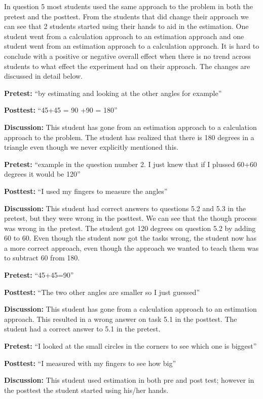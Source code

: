 \bigskip\noindent
In question 5 most students used the same approach to the problem in both the pretest and the posttest. From the students that did change their approach we can see that 2 students started using their hands to aid in the estimation. One student went from a calculation approach to an estimation approach and one student went from an estimation approach to a calculation approach. It is hard to conclude with a positive or negative overall effect when there is no trend across students to what effect the experiment had on their approach. The changes are discussed in detail below.

\bigskip\noindent
\textbf{Pretest:} ``by estimating and looking at the other angles for example''
\par\noindent \textbf{Posttest:} ``45+45 = 90  +90 = 180''
\par\noindent \textbf{Discussion:} This student has gone from an estimation approach to a calculation approach to the problem. The student has realized that there is 180 degrees in a triangle even though we never explicitly mentioned this.

\bigskip\noindent
\textbf{Pretest:} ``example in the question number 2. I just knew that if I plussed 60+60 degrees it would be 120''
\par\noindent \textbf{Posttest:} ``I used my fingers to measure the angles''
\par\noindent \textbf{Discussion:} This student had correct answers to questions 5.2 and 5.3 in the pretest, but they were wrong in the posttest. We can see that the though process was wrong in the pretest. The student got 120 degrees on question 5.2 by adding 60 to 60. Even though the student now got the tasks wrong, the student now has a more correct approach, even though the approach we wanted to teach them was to subtract 60 from 180.

\bigskip\noindent
\textbf{Pretest:} ``45+45=90''
\par\noindent \textbf{Posttest:} ``The two other angles are smaller so I just guessed''
\par\noindent \textbf{Discussion:} This student has gone from a calculation approach to an estimation approach. This resulted in a wrong answer on task 5.1 in the posttest. The student had a correct answer to 5.1 in the pretest.

\bigskip\noindent
\textbf{Pretest:} ``I looked at the small circles in the corners to see which one is biggest''
\par\noindent \textbf{Posttest:} ``I measured with my fingers to see how big''
\par\noindent \textbf{Discussion:} This student used estimation in both pre and post test; however in the posttest the student started using his/her hands. 

